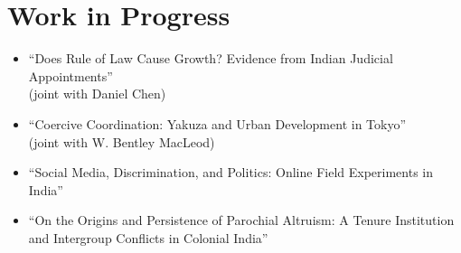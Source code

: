 \documentclass[12pt]{article}
\begin{document}
\section*{Work in Progress}
\begin{itemize}
    \item ``Does Rule of Law Cause Growth? Evidence from Indian Judicial Appointments'' \\
    (joint with Daniel Chen)

    \item ``Coercive Coordination: Yakuza and Urban Development in Tokyo'' \\
    (joint with W. Bentley MacLeod)

    \item ``Social Media, Discrimination, and Politics: Online Field Experiments in India''

    \item ``On the Origins and Persistence of Parochial Altruism: A Tenure Institution and Intergroup Conflicts in Colonial India''
\end{itemize}

\end{document}
